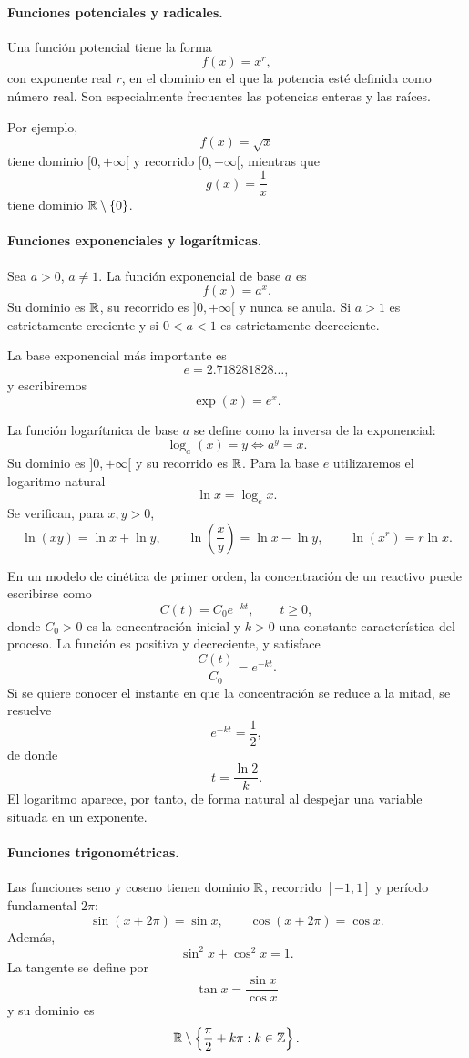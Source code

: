 \paragraph{Funciones potenciales y radicales.}
Una función potencial tiene la forma
\[
f(x)=x^r,
\]
con exponente real $r$, en el dominio en el que la potencia esté definida como número real. Son especialmente frecuentes las potencias enteras y las raíces.

Por ejemplo,
\[
f(x)=\sqrt{x}
\]
tiene dominio $[0,+\infty[$ y recorrido $[0,+\infty[$, mientras que
\[
g(x)=\frac{1}{x}
\]
tiene dominio $\mathbb{R}\setminus\{0\}$.

\paragraph{Funciones exponenciales y logarítmicas.}
Sea $a>0$, $a\neq1$. La función exponencial de base $a$ es
\[
f(x)=a^x.
\]
Su dominio es $\mathbb{R}$, su recorrido es $]0,+\infty[$ y nunca se anula. Si $a>1$ es estrictamente creciente y si $0<a<1$ es estrictamente decreciente.

La base exponencial más importante es
\[
e=2.718281828\ldots,
\]
y escribiremos
\[
\exp(x)=e^x.
\]

La función logarítmica de base $a$ se define como la inversa de la exponencial:
\[
\log_a(x)=y\Longleftrightarrow a^y=x.
\]
Su dominio es $]0,+\infty[$ y su recorrido es $\mathbb{R}$. Para la base $e$ utilizaremos el logaritmo natural
\[
\ln x=\log_e x.
\]
Se verifican, para $x,y>0$,
\[
\ln(xy)=\ln x+\ln y,
\qquad
\ln\left(\frac{x}{y}\right)=\ln x-\ln y,
\qquad
\ln(x^r)=r\ln x.
\]

\begin{example}
En un modelo de cinética de primer orden, la concentración de un reactivo puede escribirse como
\[
C(t)=C_0e^{-kt},\qquad t\geq0,
\]
donde $C_0>0$ es la concentración inicial y $k>0$ una constante característica del proceso. La función es positiva y decreciente, y satisface
\[
\frac{C(t)}{C_0}=e^{-kt}.
\]
Si se quiere conocer el instante en que la concentración se reduce a la mitad, se resuelve
\[
e^{-kt}=\frac12,
\]
de donde
\[
t=\frac{\ln2}{k}.
\]
El logaritmo aparece, por tanto, de forma natural al despejar una variable situada en un exponente.
\end{example}

\paragraph{Funciones trigonométricas.}
Las funciones seno y coseno tienen dominio $\mathbb{R}$, recorrido $[-1,1]$ y período fundamental $2\pi$:
\[
\sin(x+2\pi)=\sin x,
\qquad
\cos(x+2\pi)=\cos x.
\]
Además,
\[
\sin^2x+\cos^2x=1.
\]
La tangente se define por
\[
\tan x=\frac{\sin x}{\cos x}
\]
y su dominio es
\[
\mathbb{R}\setminus\left\{\frac{\pi}{2}+k\pi:k\in\mathbb{Z}\right\}.
\]


